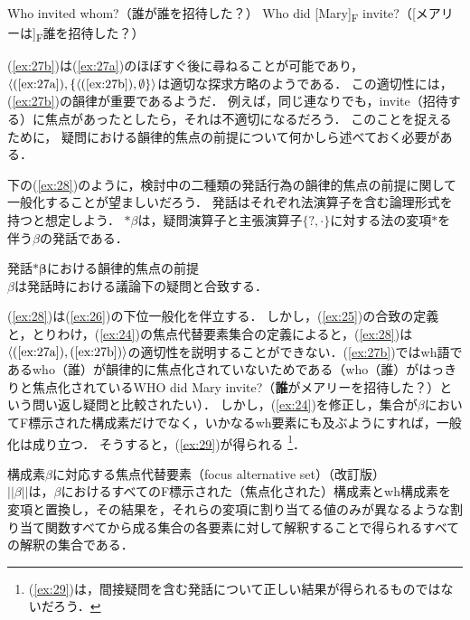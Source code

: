 \documentclass{goken}
\newcommand{\term}[2]{\textsf{#1}（#2）}
\newcommand{\ori}[1]{\noindent\textcolor[gray]{0.7}{\fontsize{8pt}{8pt}\selectfont{\textsf{(p.~#1)}}} }
\begin{document}
\begin{exe}
	\ex\label{ex:27}
	\begin{xlist}
    \ex\label{ex:27a} Who invited whom?（誰が誰を招待した？）
    \ex\label{ex:27b} Who did [Mary]\textsubscript{F} invite?（[メアリーは]\textsubscript{F}誰を招待した？）
  \end{xlist}
\end{exe}

\noindent
(\ref{ex:27b})は(\ref{ex:27a})のほぼすぐ後に尋ねることが可能であり，$\langle(\text{\ref{ex:27a}}), \{\langle(\text{\ref{ex:27b}}), \emptyset\}\rangle$は適切な探求方略のようである．
この適切性には，(\ref{ex:27b})の韻律が重要であるようだ．
例えば，同じ連なりでも，invite（招待する）に焦点があったとしたら，それは不適切になるだろう．
このことを捉えるために，\ori{33}疑問における韻律的焦点の前提について何かしら述べておく必要がある．

下の(\ref{ex:28})のように，検討中の二種類の発話行為の韻律的焦点の前提に関して一般化することが望ましいだろう．
発話はそれぞれ法演算子を含む論理形式を持つと想定しよう．
$\ast\beta$は，疑問演算子と主張演算子$\{?, \cdot\}$に対する法の変項$\ast$を伴う$\beta$の発話である．

\begin{exe}
	\ex\label{ex:28} \textsf{発話$\boldsymbol{\ast\beta}$における韻律的焦点の前提}\\
%
  $\beta$は発話時における議論下の疑問と合致する．
\end{exe}

\noindent
(\ref{ex:28})は(\ref{ex:26})の下位一般化を伴立する．
しかし，(\ref{ex:25})の合致の定義と，とりわけ，(\ref{ex:24})の焦点代替要素集合の定義によると，(\ref{ex:28})は$\langle(\text{\ref{ex:27a}}), (\text{\ref{ex:27b}})\rangle$の適切性を説明することができない．(\ref{ex:27b})ではwh語であるwho（誰）が韻律的に焦点化されていないためである（who（誰）がはっきりと焦点化されているWHO did Mary invite?（\textbf{誰}がメアリーを招待した？）という問い返し疑問と比較されたい）．
しかし，(\ref{ex:24})を修正し，集合が$\beta$においてF標示された構成素だけでなく，いかなるwh要素にも及ぶようにすれば，一般化は成り立つ．
そうすると，(\ref{ex:29})が得られる
\footnote{%
  (\ref{ex:29})は，間接疑問を含む発話について正しい結果が得られるものではないだろう．
}．

\begin{exe}
	\ex\label{ex:29} 構成素$\beta$に対応する\term{焦点代替要素}{focus alternative set}（改訂版）\\
%
	$||\beta||$は，$\beta$におけるすべてのF標示された（焦点化された）構成素とwh構成素を変項と置換し，その結果を，それらの変項に割り当てる値のみが異なるような割り当て関数すべてから成る集合の各要素に対して解釈することで得られるすべての解釈の集合である．
\end{exe}
\end{document}
